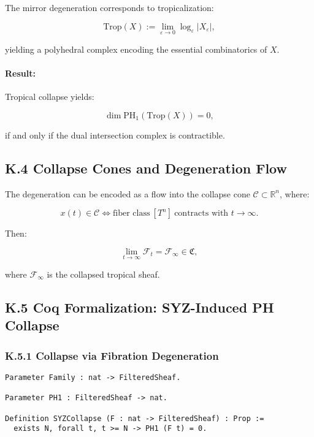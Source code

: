 \documentclass[11pt]{article}
\begin{document}
The mirror degeneration corresponds to tropicalization:

\[
\mathrm{Trop}(X) := \lim_{\varepsilon \to 0} \log_\varepsilon |X_\varepsilon|,
\]

yielding a polyhedral complex encoding the essential combinatorics of \( X \).

\paragraph{Result:}  
Tropical collapse yields:

\[
\dim \mathrm{PH}_1(\mathrm{Trop}(X)) = 0,
\]

if and only if the dual intersection complex is contractible.

\subsection*{K.4 Collapse Cones and Degeneration Flow}

The degeneration can be encoded as a flow into the collapse cone \( \mathcal{C} \subset \mathbb{R}^n \), where:

\[
x(t) \in \mathcal{C} \iff \text{fiber class} \ [T^n] \ \text{contracts with } t \to \infty.
\]

Then:

\[
\lim_{t \to \infty} \mathcal{F}_t = \mathcal{F}_\infty \in \mathfrak{C},
\]

where \( \mathcal{F}_\infty \) is the collapsed tropical sheaf.

\subsection*{K.5 Coq Formalization: SYZ-Induced PH Collapse}

\subsubsection*{K.5.1 Collapse via Fibration Degeneration}

\begin{lstlisting}[language=Coq, caption=SYZ Geometric Collapse Predicate, captionpos=b]
Parameter Family : nat -> FilteredSheaf.

Parameter PH1 : FilteredSheaf -> nat.

Definition SYZCollapse (F : nat -> FilteredSheaf) : Prop :=
  exists N, forall t, t >= N -> PH1 (F t) = 0.
\end{lstlisting}
\end{document}
